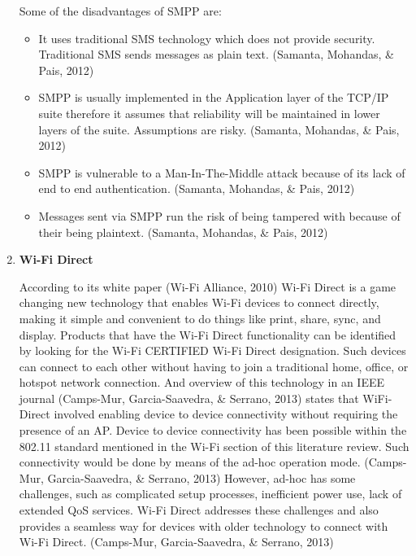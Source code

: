\documentclass[12pt,svgnames,smaller]{article} %
\begin{document}
\begin{enumerate}
		Some of the disadvantages of SMPP are:
		
		\begin{itemize}
			\item It uses traditional SMS technology which does not provide security. Traditional SMS sends messages as plain text. (Samanta, Mohandas, \& Pais, 2012)
			\item SMPP is usually implemented in the Application layer of the TCP/IP suite therefore it assumes that reliability will be maintained in lower layers of the suite. Assumptions are risky. (Samanta, Mohandas, \& Pais, 2012)
			\item SMPP is vulnerable to a Man-In-The-Middle attack because of its lack of end to end authentication. (Samanta, Mohandas, \& Pais, 2012)
			\item Messages sent via SMPP run the risk of being tampered with because of their being plaintext. (Samanta, Mohandas, \& Pais, 2012)
		\end{itemize}
		
		
		\item \textbf{ Wi-Fi Direct }
		
		According to its white paper (Wi-Fi Alliance, 2010) Wi-Fi Direct is a game changing new technology that enables Wi-Fi devices to connect directly, making it simple and convenient to do things like print, share, sync, and display. Products that have the Wi-Fi Direct functionality can be identified by looking for the Wi-Fi CERTIFIED Wi-Fi Direct designation. Such devices can connect to each other without having to join a traditional home, office, or hotspot network connection. And overview of this technology in an IEEE journal (Camps-Mur, Garcia-Saavedra, \& Serrano, 2013) states that WiFi-Direct involved enabling device to device connectivity without requiring the presence of an AP. Device to device connectivity has been possible within the 802.11 standard mentioned in the Wi-Fi section of this literature review. Such connectivity would be done by means of the ad-hoc operation mode. (Camps-Mur, Garcia-Saavedra, \& Serrano, 2013) However, ad-hoc has some challenges, such as complicated setup processes, inefficient power use, lack of extended QoS services. Wi-Fi Direct addresses these challenges and also provides a seamless way for devices with older technology to connect with Wi-Fi Direct. (Camps-Mur, Garcia-Saavedra, \& Serrano, 2013)
		

\end{enumerate}
\end{document}
